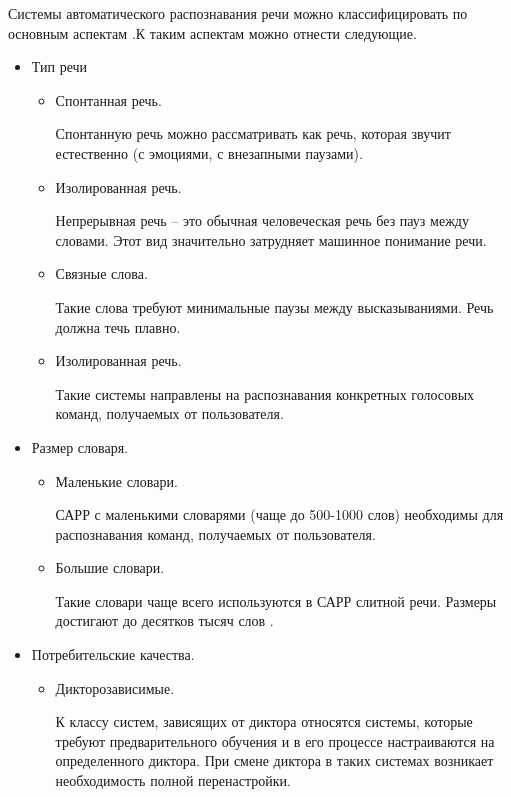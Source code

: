 Системы автоматического распознавания речи можно классифицировать по основным аспектам \cite{classif}.К таким аспектам можно отнести следующие. 
\begin{itemize}
	\item Тип речи
	\begin{itemize}
		\item Спонтанная речь.
		
		Спонтанную речь можно рассматривать как речь, которая звучит естественно (с эмоциями, с внезапными паузами).
		
		\item Изолированная речь. 
		
		Непрерывная речь -- это обычная человеческая речь без пауз между словами. Этот вид значительно затрудняет машинное понимание речи.
		
		\item Связные слова.
		
		Такие слова требуют минимальные паузы между высказываниями. Речь должна течь плавно.
		
		\item Изолированная речь.
		
		Такие системы направлены на распознавания конкретных голосовых команд, получаемых от пользователя.
		
	\end{itemize}
	
	\item Размер словаря.
	\begin{itemize}
		\item Маленькие словари.
		
		САРР с маленькими словарями (чаще до 500-1000 слов) необходимы для распознавания команд, получаемых от пользователя.
		
		\item Большие словари.
		
		Такие словари чаще всего используются в САРР слитной речи. Размеры достигают до десятков тысяч слов \cite{babin}.
	\end{itemize}
	
	\item Потребительские качества.
	\begin{itemize}
		\item Дикторозависимые.
		
		К классу систем, зависящих от диктора относятся системы, которые требуют предварительного обучения и в его процессе настраиваются на определенного диктора. При смене диктора в таких системах возникает необходимость полной перенастройки. 
		

\end{itemize}
\end{itemize}
